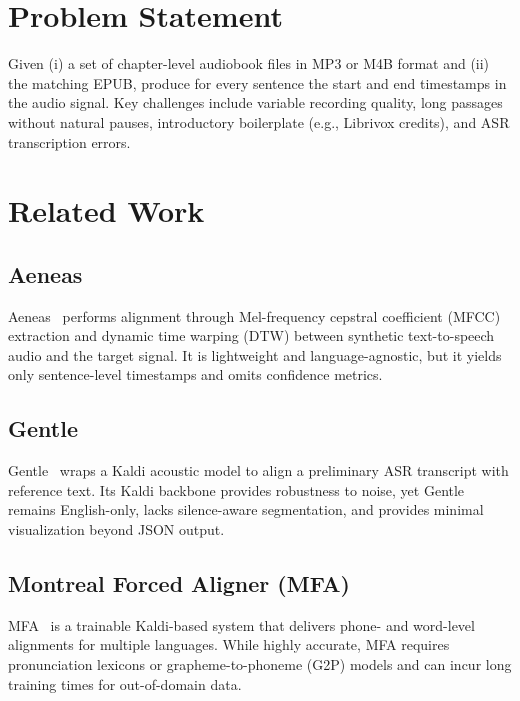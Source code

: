 \documentclass[12pt]{article}
\begin{document}
\section{Problem Statement}
Given (i) a set of chapter-level audiobook files in MP3 or M4B format and
(ii) the matching EPUB, produce for every sentence the start and end
timestamps in the audio signal.
Key challenges include variable recording quality, long passages without
natural pauses, introductory boilerplate (e.g., Librivox credits), and ASR
transcription errors.

\section{Related Work}
\subsection{Aeneas}
Aeneas~\cite{aeneas2017} performs alignment through Mel-frequency cepstral
coefficient (MFCC) extraction and dynamic time warping (DTW) between synthetic
text-to-speech audio and the target signal.
It is lightweight and language-agnostic, but it yields only sentence-level
timestamps and omits confidence metrics.

\subsection{Gentle}
Gentle~\cite{gentle2018} wraps a Kaldi acoustic model to
align a preliminary ASR transcript with reference text.
Its Kaldi backbone provides robustness to noise, yet Gentle remains
English-only, lacks silence-aware segmentation, and provides minimal
visualization beyond JSON output.

\subsection{Montreal Forced Aligner (MFA)}
MFA~\cite{mfa2017} is a trainable Kaldi-based system that delivers
phone- and word-level alignments for multiple languages.
While highly accurate, MFA requires pronunciation lexicons or grapheme-to-phoneme
(G2P) models and can incur long training times for out-of-domain data.
\end{document}
